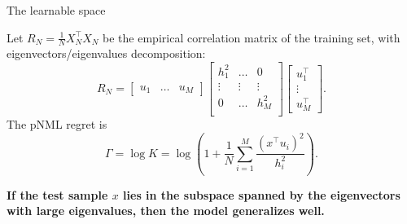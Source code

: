 \documentclass[aspectratio=169]{beamer}
\begin{document}
\begin{frame}{The learnable space}
\begin{theorem}
    Let $R_N=\frac{1}{N} X_N^\top X_N  $ be the empirical correlation matrix of the training set, with eigenvectors/eigenvalues decomposition: 
    \begin{equation*}
    R_N = \begin{bmatrix} u_1 & \hdots & u_M \end{bmatrix}
    \begin{bmatrix}
    h_1^2 & \hdots & 0 \\
    \vdots & \vdots &  \vdots \\
    0 & \hdots &  h_M^2 \\
    \end{bmatrix}
    \begin{bmatrix}
    u_1^\top \\ \vdots \\ u_M^\top 
    \end{bmatrix}.
    \end{equation*}
    \newline
    The pNML regret is
    \begin{equation}
    \Gamma = \log K = \log \left(1 + \frac{1}{N} \sum_{i=1}^{M} \frac{\left(x^\top u_i\right)^2 }{h_i^2}\right).
    \end{equation}
\end{theorem} 
\pause
{\bf If the test sample $x$ lies in the subspace spanned by the eigenvectors with large eigenvalues, then the model generalizes well.}

\end{frame}
\end{document}
